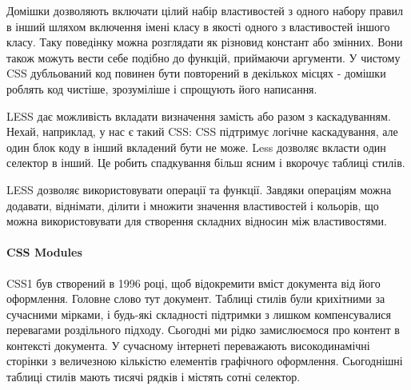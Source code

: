 
Домішки дозволяють включати цілий набір властивостей з одного набору правил в інший шляхом включення імені класу в якості одного з властивостей іншого класу. Таку поведінку можна розглядати як різновид констант або змінних. Вони також можуть вести себе подібно до функцій, приймаючи аргументи. У чистому CSS дубльований код повинен бути повторений в декількох місцях - домішки роблять код чистіше, зрозуміліше і спрощують його написання.



LESS дає можливість вкладати визначення замість або разом з каскадуванням. Нехай, наприклад, у нас є такий CSS: CSS підтримує логічне каскадування, але один блок коду в інший вкладений бути не може. Less дозволяє вкласти один селектор в інший. Це робить спадкування більш ясним і вкорочує таблиці стилів.



LESS дозволяє використовувати операції та функції. Завдяки операціям можна додавати, віднімати, ділити і множити значення властивостей і кольорів, що можна використовувати для створення складних відносин між властивостями.

\paragraph{CSS Modules}

CSS1 був створений в 1996 році, щоб відокремити вміст документа від його оформлення. Головне слово тут документ. Таблиці стилів були крихітними за сучасними мірками, і будь-які складності підтримки з лишком компенсувалися перевагами роздільного підходу. Сьогодні ми рідко замислюємося про контент в контексті документа. У сучасному інтернеті переважають високодинамічні сторінки з величезною кількістю елементів графічного оформлення. Сьогоднішні таблиці стилів мають тисячі рядків і містять сотні селектор.

